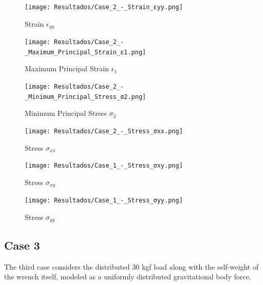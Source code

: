 \documentclass[12pt]{article}
\begin{document}
\begin{figure}[H]
    \centering
    \begin{minipage}{0.48\textwidth}
        \centering
        \texttt{[image: Resultados/Case\_2\_-\_Strain\_εyy.png]}
        \caption{Strain $\epsilon_{yy}$}
        \label{fig:fig17}
    \end{minipage}
    \hfill
    \begin{minipage}{0.48\textwidth}
        \centering
        \texttt{[image: Resultados/Case\_2\_-\_Maximum\_Principal\_Strain\_ε1.png]}
        \caption{Maximum Principal Strain $\epsilon_1$}
        \label{fig:fig18}
    \end{minipage}
\end{figure}

\begin{figure}[H]
    \centering
    \begin{minipage}{0.48\textwidth}
        \centering
        \texttt{[image: Resultados/Case\_2\_-\_Minimum\_Principal\_Stress\_σ2.png]}
        \caption{Minimum Principal Stress $\sigma_2$}
        \label{fig:fig19}
    \end{minipage}
    \hfill
    \begin{minipage}{0.48\textwidth}
        \centering
        \texttt{[image: Resultados/Case\_2\_-\_Stress\_σxx.png]}
        \caption{Stress $\sigma_{xx}$}
        \label{fig:fig20}
    \end{minipage}
\end{figure}

\begin{figure}[H]
    \centering
    \begin{minipage}{0.48\textwidth}
        \centering
        \texttt{[image: Resultados/Case\_1\_-\_Stress\_σxy.png]}
        \caption{Stress $\sigma_{xy}$}
        \label{fig:fig21}
    \end{minipage}
    \hfill
    \begin{minipage}{0.48\textwidth}
        \centering
        \texttt{[image: Resultados/Case\_1\_-\_Stress\_σyy.png]}
        \caption{Stress $\sigma_{yy}$}
        \label{fig:fig22}
    \end{minipage}
\end{figure}



\newpage
\subsection{Case 3}

The third case considers the distributed 30 kgf load along with the self-weight of the wrench itself, modeled as a uniformly distributed gravitational body force.
\end{document}
